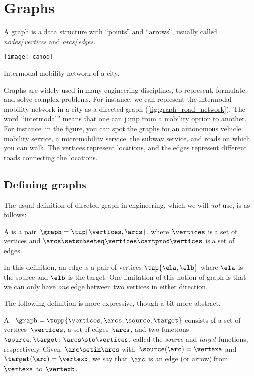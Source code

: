 
\section{Graphs}

A graph is a data structure with ``points'' and ``arrows'', usually called \emph{no\-des}/\emph{ver\-tices} and \emph{arcs}/\emph{edges}.

\begin{marginfigure}
    \texttt{[image: camod]}
    \caption{Intermodal mobility network of a city.}
    \label{fig:graph_road_network}
\end{marginfigure}

Graphs are widely used in many engineering disciplines, to represent, formulate, and solve complex problems.
For instance, we can represent the intermodal mobility network in a city as a directed graph (\cref{fig:graph_road_network}).
The word ``intermodal'' means that one can jump from a mobility option to another.
For instance, in the figure, you can spot the graphs for an autonomous vehicle mobility service, a micromobility service, the subway service, and roads on which you can walk.
The vertices represent locations, and the edges represent different roads connecting the locations.

\subsection{Defining graphs}

The usual definition of directed graph in engineering, which we will \emph{not} use, is as follows:

\begin{definition}
    \label{def:directed-graph}
    A \emph{} is a pair~$\graph=\tup{\vertices, \arcs}$, where~$\vertices$ is
    a set of vertices and $\arcs \setsubseteq \vertices \cartprod \vertices$ is a set of edges.
\end{definition}
In this definition, an edge is a pair of vertices $\tup{\ela,\elb}$ where $\ela$ is the source and $\elb$ is the target.
One limitation of this notion of graph is that we can only have \emph{one} edge between two vertices in either direction.

The following definition is more expressive, though a bit more abstract.

\begin{definition}
    \label{def:Graph}
    A \emph{}~$\graph=\tupp{\vertices,\arcs, \source,\target}$ consists of a set of vertices~$\vertices$, a set of edges~$\arcs$, and two functions~$\source,\target \colon \arcs \sto \vertices$, called the \emph{source} and \emph{target} functions, respectively.
    Given~$\arc\setin \arcs$ with~$\source(\arc)=\vertexa$ and~$\target(\arc)=\vertexb$, we say that~$\arc$ is an edge (or arrow) from~$\vertexa$ to~$\vertexb$.
\end{definition}

